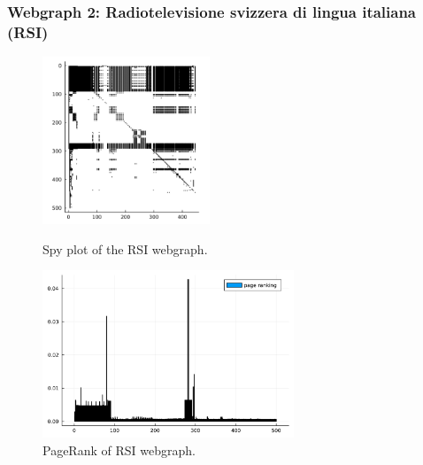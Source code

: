 \documentclass[unicode,11pt,a4paper,oneside,numbers=endperiod,openany]{scrartcl}
\begin{document}
\subsubsection{Webgraph 2: Radiotelevisione svizzera di lingua italiana (RSI)}
\begin{figure}[h!]
    \begin{minipage}{0.5\textwidth}
        \centering
        \includegraphics[height=5cm]{fig/RSI.jpg}
        \caption{Spy plot of the RSI webgraph.}
        \label{fig:RSI}
    \end{minipage}
    \begin{minipage}{0.5\textwidth}
        \centering
        \includegraphics[height=5cm]{fig/RSI_pagerank.jpg}
        \caption{PageRank of RSI webgraph.}
        \label{fig:RSI_pagerank}
    \end{minipage}
\end{figure}
\end{document}
